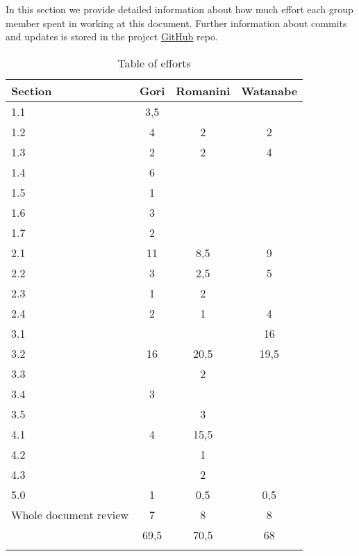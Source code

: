 In this section we provide detailed information about how much effort each group member spent in working at this document. Further information about commits and updates is stored in the project \href{https://github.com/MarcoRomanini/GoriRomaniniWatanabe}{GitHub} repo.



\begin{center}
    \setlength\arrayrulewidth{1pt}
    \begin{longtable}{lccc}
        
        \hline
        \rowcolor{myblue}\color{white}Section & \color{white}Gori & \color{white}Romanini & \color{white}Watanabe \\
        \hline
        1.1	&	3,5	&		&		\\
        \hline
        1.2	&	4	&	2	&	2	\\
        \hline
        1.3	&	2	&	2	&	4	\\
        \hline
        1.4	&	6	&		&		\\
        \hline
        1.5	&	1	&		&		\\
        \hline
        1.6	&	3	&		&		\\
        \hline
        1.7	&	2	&		&		\\
        \hline
        2.1	&	11	&	8,5	&	9	\\
        \hline
        2.2	&	3	&	2,5	&	5	\\
        \hline
        2.3	&	1	&	2	&		\\
        \hline
        2.4	&	2	&	1	&	4	\\
        \hline
        3.1	&		&		&	16	\\
        \hline
        3.2	&	16	&	20,5	&	19,5	\\
        \hline
        3.3	&		&	2	&		\\
        \hline
        3.4	&	3	&		&		\\
        \hline
        3.5	&		&	3	&		\\
        \hline
        4.1	&	4	&	15,5	&		\\
        \hline
        4.2	&		&	1	&		\\
        \hline
        4.3	&		&	2	&		\\
        \hline
        5.0	&	1	&	0,5	&	0,5	\\
        \hline
        Whole document review 	&	7	&	8	&	8	\\
        \hline
        &	69,5	&	70,5	&	68	\\
        \hline
        
        \rowcolor{white}\caption{\label{tab:effort}Table of efforts}
        
    \end{longtable}
\end{center}

